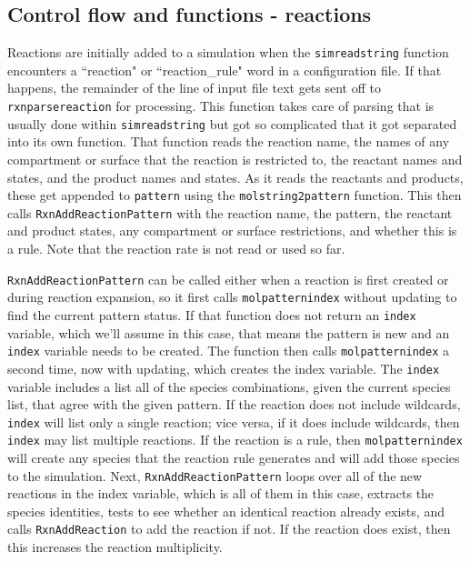 \documentclass {book}
\begin{document}
\subsection*{Control flow and functions - reactions}

Reactions are initially added to a simulation when the \texttt{simreadstring} function encounters a ``reaction" or ``reaction\_rule" word in a configuration file.  If that happens, the remainder of the line of input file text gets sent off to \texttt{rxnparsereaction} for processing.  This function takes care of parsing that is usually done within \texttt{simreadstring} but got so complicated that it got separated into its own function.  That function reads the reaction name, the names of any compartment or surface that the reaction is restricted to, the reactant names and states, and the product names and states.  As it reads the reactants and products, these get appended to \texttt{pattern} using the \texttt{molstring2pattern} function.  This then calls \texttt{RxnAddReactionPattern} with the reaction name, the pattern, the reactant and product states, any compartment or surface restrictions, and whether this is a rule.  Note that the reaction rate is not read or used so far.

\texttt{RxnAddReactionPattern} can be called either when a reaction is first created or during reaction expansion, so it first calls \texttt{molpatternindex} without updating to find the current pattern status.  If that function does not return an \texttt{index} variable, which we'll assume in this case, that means the pattern is new and an \texttt{index} variable needs to be created.  The function then calls \texttt{molpatternindex} a second time, now with updating, which creates the index variable.  The \texttt{index} variable includes a list all of the species combinations, given the current species list, that agree with the given pattern.  If the reaction does not include wildcards, \texttt{index} will list only a single reaction; vice versa, if it does include wildcards, then \texttt{index} may list multiple reactions.  If the reaction is a rule, then \texttt{molpatternindex} will create any species that the reaction rule generates and will add those species to the simulation.  Next, \texttt{RxnAddReactionPattern} loops over all of the new reactions in the index variable, which is all of them in this case, extracts the species identities, tests to see whether an identical reaction already exists, and calls \texttt{RxnAddReaction} to add the reaction if not.  If the reaction does exist, then this increases the reaction multiplicity.
\end{document}

